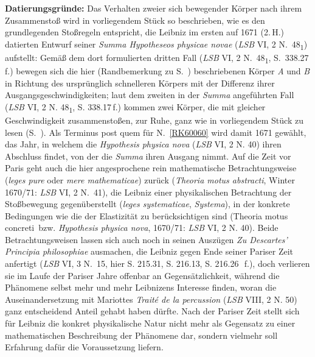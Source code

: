 \begin{ledgroup}
\footnotesize
\pstart
\noindent%
\textbf{Datierungsgründe:}  %
Das Verhalten zweier sich bewegender Körper nach ihrem Zusammenstoß wird in vorliegendem Stück so beschrieben, wie es den grundlegenden Stoßregeln entspricht, die Leibniz im ersten auf 1671 (2.\,H.) datierten Entwurf seiner \textit{Summa Hypotheseos physicae novae} (\textit{LSB} VI, 2 N.~48\textsubscript1\cite{01276}) aufstellt: Gemäß dem dort formulierten dritten Fall (\textit{LSB} VI, 2 N.~48\textsubscript1, S.~338.27\,f.) bewegen sich die hier (Randbemerkung zu S.~) beschriebenen Körper \textit{A} und \textit{B} in Richtung des ursprünglich schnelleren Körpers mit der Differenz ihrer Ausgangsgeschwindigkeiten; laut dem zweiten in der \textit{Summa} angeführten Fall (\textit{LSB} VI, 2 N. 48\textsubscript1, S. 338.17\,f.) kommen zwei Körper, die mit gleicher Geschwindigkeit zusammenstoßen, zur Ruhe, ganz wie in vorliegendem Stück zu lesen (S.~). 
Als Terminus post quem für N.~\ref{RK60060} wird damit 1671 gewählt, das Jahr, in welchem die \textit{Hypothesis physica nova} (\textit{LSB} VI, 2 N. 40\cite{00256}) ihren Abschluss findet, von der die \textit{Summa} ihren Ausgang nimmt.
Auf die Zeit vor Paris geht auch die hier angesprochene rein mathematische Betrachtungsweise (\textit{leges pure} oder \textit{mere mathematicae}) zurück (\textit{Theoria motus abstracti}, Winter 1670/71: \textit{LSB} VI, 2 N.~41\cite{00259}), die Leibniz einer physikalischen Betrachtung der Stoßbewegung gegenüberstellt (\textit{leges systematicae}, \textit{Systema}), in der konkrete Bedingungen wie die der Elastizität zu berücksichtigen sind (\glqq Theoria motus concreti\grqq\ bzw. \textit{Hypothesis physica nova}, 1670/71: \textit{LSB} VI, 2 N. 40\cite{00256}). 
Beide Betrachtungsweisen lassen sich auch noch in seinen Auszügen \textit{Zu Descartes’ Principia philosophiae} ausmachen, die Leibniz gegen Ende seiner Pariser Zeit anfertigt (\textit{LSB} VI, 3 N.~15\cite{01302}, hier S. 215.31, S. 216.13, S. 216.26\,~f.), doch verlieren sie im Laufe der Pariser Jahre offenbar an Gegensätzlichkeit, während die Phänomene selbst mehr und mehr Leibnizens Interesse finden, woran die Auseinandersetzung mit Mariottes\protect{} \textit{Traité de la percussion}\cite{00311} (\textit{LSB} VIII, 2 N. 50\cite{01292}) ganz entscheidend Anteil gehabt haben dürfte. Nach der Pariser Zeit stellt sich für Leibniz die konkret physikalische Natur nicht mehr als Gegensatz zu einer mathematischen Beschreibung der Phänomene dar, sondern vielmehr soll Erfahrung dafür die Voraussetzung liefern.

\end{ledgroup}
